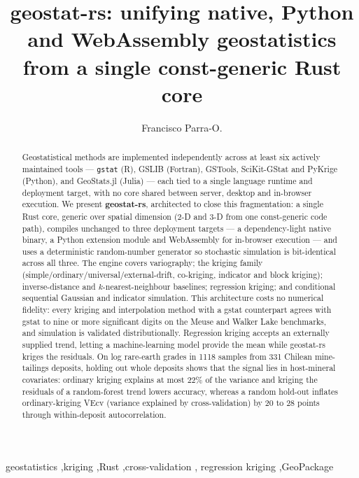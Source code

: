 \documentclass[preprint,12pt,authoryear]{elsarticle}
\begin{document}
\begin{frontmatter}

\title{geostat-rs: unifying native, Python and WebAssembly geostatistics from
a single const-generic Rust core}

\author[a]{Francisco Parra-O.}

\begin{abstract}
Geostatistical methods are implemented independently across at least six
actively maintained tools --- \texttt{gstat} (\textsf{R}), GSLIB (Fortran),
GSTools, SciKit-GStat and PyKrige (\textsf{Python}), and GeoStats.jl (Julia)
--- each tied to a single language runtime and deployment target, with no core
shared between server, desktop and in-browser execution. We present
\textbf{geostat-rs}, architected to close this fragmentation: a single Rust
core, generic over spatial dimension (2-D and 3-D from one const-generic code
path), compiles unchanged to three deployment targets --- a dependency-light
native binary, a Python extension module and
WebAssembly for in-browser execution --- and uses a
deterministic random-number generator so stochastic simulation is
bit-identical across all three. The engine covers
variography; the kriging family
(simple/ordinary/universal/external-drift, co-kriging, indicator and block
kriging); inverse-distance and $k$-nearest-neighbour baselines; regression
kriging; and conditional sequential Gaussian and indicator simulation. This architecture costs no numerical fidelity: every kriging and
interpolation method with a gstat counterpart agrees with gstat to nine or more
significant digits on the
Meuse and Walker Lake benchmarks, and simulation is validated distributionally. Regression kriging
accepts an externally supplied trend, letting a machine-learning model provide
the mean while geostat-rs kriges the residuals. On log rare-earth grades in 1118 samples from 331 Chilean mine-tailings deposits, holding out whole deposits shows that the signal lies in host-mineral covariates: ordinary kriging explains at most 22\% of the variance and kriging the residuals of a random-forest trend lowers accuracy, whereas a random hold-out inflates ordinary-kriging VEcv (variance explained by cross-validation) by 20 to 28 points through within-deposit autocorrelation.
\end{abstract}

\begin{keyword}
geostatistics \sep kriging \sep Rust \sep cross-validation \sep
regression kriging \sep GeoPackage
\end{keyword}

\end{frontmatter}
\end{document}

